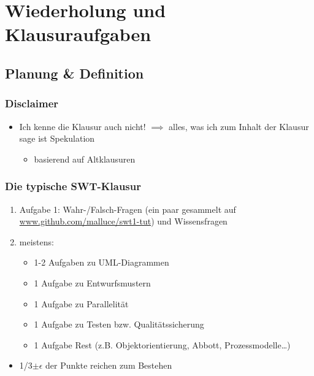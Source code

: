 \documentclass[18pt]{beamer}
\begin{document}
\section{Wiederholung und Klausuraufgaben}

	\subsection{Planung \& Definition}
	\begin{frame}
		\frametitle{Disclaimer}
		\begin{large}
			\begin{itemize}
				\item Ich kenne die Klausur auch nicht! \pause
				\linebreak $\implies$ alles, was ich zum Inhalt der Klausur sage ist Spekulation
				\begin{itemize}
					\item basierend auf Altklausuren
				\end{itemize}
			\end{itemize}
		\end{large}
	\end{frame}

	\begin{frame}
		\frametitle{Die typische SWT-Klausur}
		\begin{enumerate}
			\item Aufgabe 1: Wahr-/Falsch-Fragen (ein paar gesammelt auf \url{www.github.com/malluce/swt1-tut})
			 und Wissensfragen\pause
			\item meistens:
			\begin{itemize}
				\item 1-2 Aufgaben zu UML-Diagrammen \pause
				\item 1 Aufgabe zu Entwurfsmustern \pause
				\item 1 Aufgabe zu Parallelität \pause
				\item 1 Aufgabe zu Testen bzw. Qualitätssicherung \pause
				\item 1 Aufgabe Rest (z.B. Objektorientierung, Abbott, Prozessmodelle\dots) \pause
			\end{itemize}
		\end{enumerate}
		\begin{itemize}
			\item 1/3$\pm \epsilon$ der Punkte reichen zum Bestehen
		\end{itemize}
	\end{frame}
\end{document}

